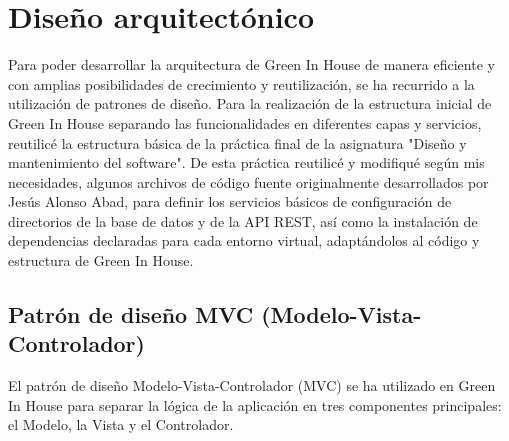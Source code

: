   




    

\section{Diseño arquitectónico}
Para poder desarrollar la arquitectura de Green In House de manera eficiente y con amplias posibilidades de crecimiento y reutilización, se ha recurrido a la utilización de patrones de diseño. Para la realización de la estructura inicial de Green In House separando las funcionalidades en diferentes capas y servicios, reutilicé la estructura básica de la práctica final de la asignatura "Diseño y mantenimiento del software". De esta práctica reutilicé y modifiqué según mis necesidades, algunos archivos de código fuente originalmente desarrollados por Jesús Alonso Abad, para definir los servicios básicos de configuración de directorios de la base de datos y de la API REST, así como la instalación de dependencias declaradas para cada entorno virtual, adaptándolos al código y estructura de Green In House.

    \subsection{Patrón de diseño MVC (Modelo-Vista-Controlador)}
    El patrón de diseño Modelo-Vista-Controlador (MVC) se ha utilizado en Green In House para separar la lógica de la aplicación en tres componentes principales: el Modelo, la Vista y el Controlador. 

